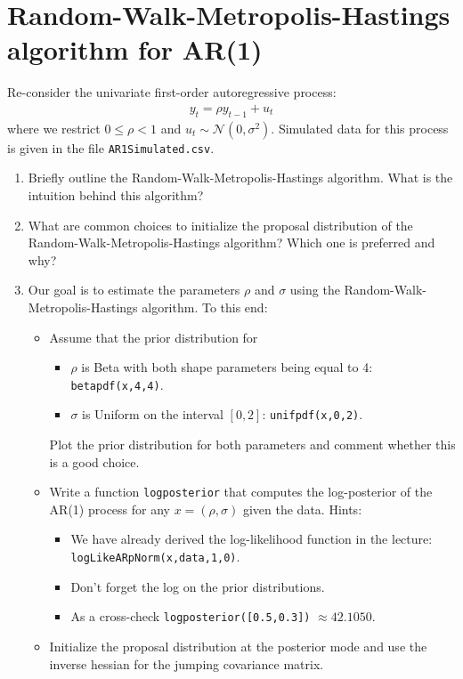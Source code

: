 \documentclass{article}
\begin{document}
\section{Random-Walk-Metropolis-Hastings algorithm for AR{(1)}}
Re-consider the univariate first-order autoregressive process:
\begin{align*}
	y_t = \rho y_{t-1} + u_t
\end{align*}
where we restrict \(0\leq \rho <1\) and \(u_t \sim \mathcal{N}(0,\sigma^2)\).
Simulated data for this process is given in the file \texttt{AR1Simulated.csv}.
\begin{enumerate}
	\item Briefly outline the Random-Walk-Metropolis-Hastings algorithm.
	What is the intuition behind this algorithm?
	\item What are common choices to initialize the proposal distribution of the Random-Walk-Metropolis-Hastings algorithm?
	Which one is preferred and why?
	\item Our goal is to estimate the parameters \(\rho \) and \(\sigma \) using the Random-Walk-Metropolis-Hastings algorithm.
	To this end:
	\begin{itemize}
		\item Assume that the prior distribution for
		\begin{itemize}
			\item \(\rho \) is Beta with both shape parameters being equal to 4: \texttt{betapdf(x,4,4)}.
			\item \(\sigma \) is Uniform on the interval \([0,2]\): \texttt{unifpdf(x,0,2)}.
		\end{itemize}
		Plot the prior distribution for both parameters and comment whether this is a good choice.
		\item Write a function \texttt{logposterior} that computes the log-posterior of the AR{(1)} process for any \(x=(\rho,\sigma)\) given the data.
		Hints:
		\begin{itemize}
			\item We have already derived the log-likelihood function in the lecture:\\\texttt{logLikeARpNorm(x,data,1,0)}.
			\item Don't forget the log on the prior distributions.
			\item As a cross-check \texttt{logposterior([0.5,0.3])} \(\approx 42.1050\).
		\end{itemize}		
		\item Initialize the proposal distribution at the posterior mode and use the inverse hessian for the jumping covariance matrix.

\end{itemize}
\end{enumerate}
\end{document}
